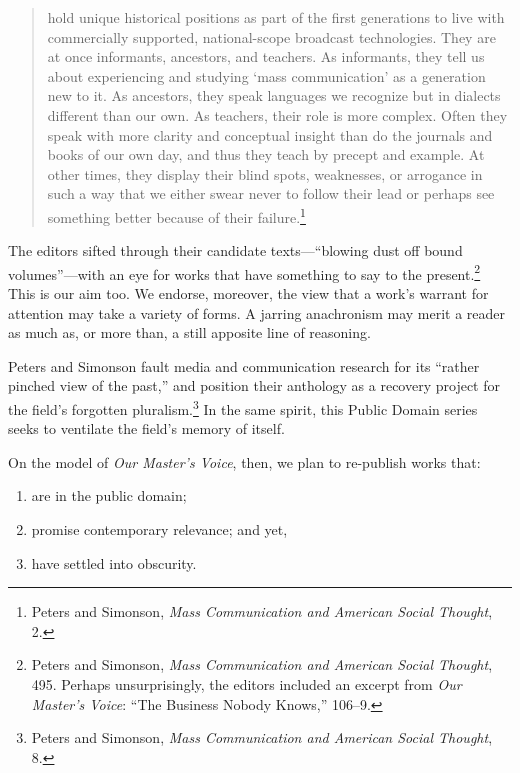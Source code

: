 \documentclass[openany,nobib]{tufte-book}
\begin{document}
\begin{quote}
hold unique historical positions as part of the first generations to
live with commercially supported, national-scope broadcast technologies.
They are at once informants, ancestors, and teachers. As informants,
they tell us about experiencing and studying `mass communication' as a
generation new to it. As ancestors, they speak languages we recognize
but in dialects different than our own. As teachers, their role is more
complex. Often they speak with more clarity and conceptual insight than
do the journals and books of our own day, and thus they teach by precept
and example. At other times, they display their blind spots, weaknesses,
or arrogance in such a way that we either swear never to follow their
lead or perhaps see something better because of their failure.\footnote{Peters and Simonson, \emph{Mass Communication and American Social
  Thought}, 2.}
\end{quote}

\noindent The editors sifted through their candidate texts---``blowing dust off
bound volumes''---with an eye for works that have something to say to
the present.\footnote{Peters and Simonson, \emph{Mass Communication and American Social
  Thought}, 495. Perhaps unsurprisingly, the editors included an excerpt
  from \emph{Our Master's Voice}: ``The Business Nobody Knows,'' 106--9.} This is our aim too. We endorse, moreover, the view that
a work's warrant for attention may take a variety of forms. A jarring
anachronism may merit a reader as much as, or more than, a still
apposite line of reasoning.

Peters and Simonson fault media and communication research for its
``rather pinched view of the past,'' and position their anthology as a
recovery project for the field's forgotten pluralism.\footnote{Peters and Simonson, \emph{Mass Communication and American Social
  Thought}, 8.} In the same
spirit, this Public Domain series seeks to ventilate the field's memory
of itself.

On the model of \emph{Our Master's Voice}, then, we plan to re-publish
works that:

\begin{enumerate}[leftmargin=3\parindent]
\item
  are in the public domain;
\item
  promise contemporary relevance; and yet,
\item
  have settled into obscurity.
\end{enumerate}
\end{document}
